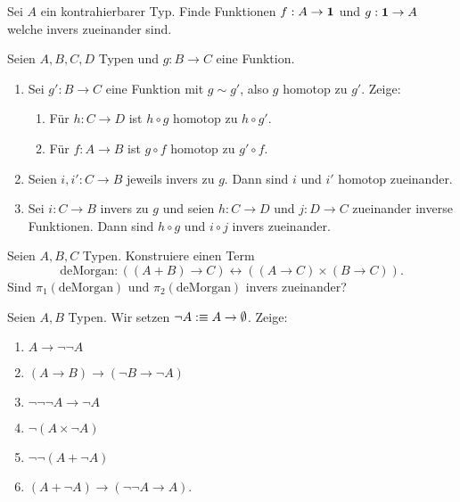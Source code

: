 \documentclass{uebung}
\begin{document}

\begin{exercise}
  Sei $A$ ein kontrahierbarer Typ.
  Finde Funktionen $f:A\to\mathbf{1}$ und $g:\mathbf{1}\to A$ welche invers zueinander sind.
\end{exercise}

\begin{exercise}
  Seien $A,B,C,D$ Typen und $g:B\to C$ eine Funktion.
  \begin{enumerate}
    \item Sei $g':B\to C$ eine Funktion mit $g\sim g'$, also $g$ homotop zu $g'$.
    Zeige:
    \begin{enumerate}
      \item Für $h:C\to D$ ist $h\circ g$ homotop zu $h\circ g'$.
      \item Für $f:A\to B$ ist $g\circ f$ homotop zu $g'\circ f$.
    \end{enumerate}
  \item Seien $i,i':C\to B$ jeweils invers zu $g$.
    Dann sind $i$ und $i'$ homotop zueinander.
  \item Sei $i:C\to B$ invers zu $g$ und seien $h:C\to D$ und $j:D\to C$ zueinander inverse Funktionen.
    Dann sind $h\circ g$ und $i\circ j$ invers zueinander.
  \end{enumerate}
\end{exercise}

\begin{exercise}
  Seien $A,B,C$ Typen.
  Konstruiere einen Term 
  \begin{equation*}
    \mathrm{deMorgan}:((A+B)\to C) \leftrightarrow ((A\to C)\times (B\to C)).
  \end{equation*}
  Sind $\pi_1(\mathrm{deMorgan})$ und $\pi_2(\mathrm{deMorgan})$ invers zueinander?
\end{exercise}

\begin{exercise}
  Seien $A,B$ Typen.
  Wir setzen $\neg A:\equiv A\to\emptyset$.
  Zeige:
  \begin{multicols}{2}
    \begin{enumerate}
      \item $A\to\neg\neg A$
      \item $(A\to B)\to(\neg B\to\neg A)$
      \item $\neg\neg\neg A\to\neg A$
      \item $\neg(A\times \neg A)$
      \item $\neg\neg(A+\neg A)$
    \item $(A+\neg A)\to (\neg\neg A\to A)$.
    \end{enumerate}
  \end{multicols}
\end{exercise}
\end{document}
